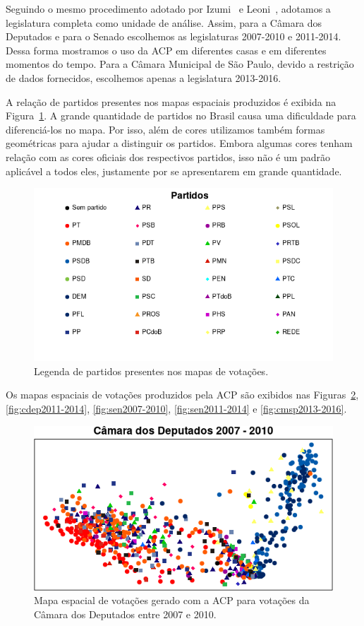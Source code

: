 \documentclass[
	article,			%
	12pt,				%
	oneside,			%
	a4paper,			%
	english,			%
	brazil,				%
	sumario=tradicional,
	oldfontcommands %
	]{abntex2}
\begin{document}
Seguindo o mesmo procedimento adotado por Izumi~\cite{izumi2016senado} e Leoni~\cite{leoni02cdep}, adotamos a legislatura completa como unidade de análise. Assim, para a Câmara dos Deputados e para o Senado escolhemos as legislaturas 2007-2010 e 2011-2014. Dessa forma mostramos o uso da ACP em diferentes casas e em diferentes momentos do tempo. Para a Câmara Municipal de São Paulo, devido a restrição de dados fornecidos, escolhemos apenas a legislatura 2013-2016. 

A relação de partidos presentes nos mapas espaciais produzidos é exibida na Figura~\ref{fig:partidos}. A grande quantidade de partidos no Brasil causa uma dificuldade para diferenciá-los no mapa. Por isso, além de cores utilizamos também formas geométricas para ajudar a distinguir os partidos. Embora algumas cores tenham relação com as cores oficiais dos respectivos partidos, isso não é um padrão aplicável a todos eles, justamente por se apresentarem em grande quantidade.

\begin{figure}[h!]
  \centering
  \includegraphics[scale=0.8]{figs/partidos.png}
  \caption{Legenda de partidos presentes nos mapas de votações.}
  \label{fig:partidos}
\end{figure}

Os mapas espaciais de votações produzidos pela ACP são exibidos nas Figuras~\ref{fig:cdep2007-2010}, \ref{fig:cdep2011-2014}, \ref{fig:sen2007-2010}, \ref{fig:sen2011-2014} e \ref{fig:cmsp2013-2016}.

\begin{figure}[h!]
  \centering
  \includegraphics[scale=0.9]{figs/cdep2007-2010.png}
  \caption{Mapa espacial de votações gerado com a ACP para votações da Câmara dos Deputados entre 2007 e 2010.}
  \label{fig:cdep2007-2010}
\end{figure}
\end{document}
